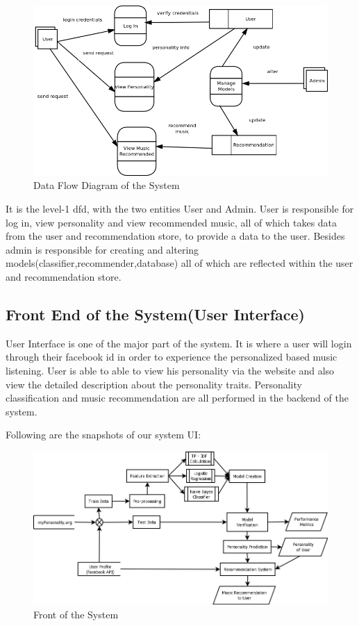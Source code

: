 \begin{figure}[!ht]
\centering
\includegraphics[width = 16 cm]{fig/dfd.png}
\caption{Data Flow Diagram of the System}
\label{fig:dfd}
\end{figure}

It is the level-1 dfd, with the two entities User and Admin. User is responsible for log in, view personality and view recommended music, all of which takes data from the user and recommendation store, to provide a data to the user. Besides admin is responsible for creating and altering models(classifier,recommender,database) all of which are reflected within the user and recommendation store.
\newpage
\subsection{Front End of the System(User Interface)}
User Interface is one of the major part of the system. It is where a user will login through their facebook id in order to experience the personalized based music listening. User is able to able to view his personality via the website and also view the detailed description about the personality traits. Personality classification and music recommendation are all performed in the backend of the system. 

Following are the snapshots of our system UI:
\begin{figure}[!ht]
\centering
\includegraphics[width = 16 cm]{fig/System.png}
\caption{Front of the System}
\label{fig:front}
\end{figure}

